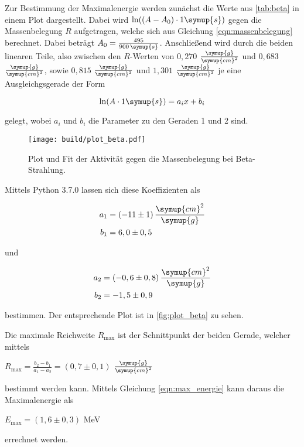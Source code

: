 Zur Bestimmung der Maximalenergie werden zunächst die Werte aus \autoref{tab:beta} in einem Plot dargestellt.
Dabei wird $\ln((A - A_0) \cdot 1 \symup{s})$ gegen die Massenbelegung $R$ aufgetragen, welche sich aus Gleichung \eqref{eqn:massenbelegung} berechnet.
Dabei beträgt $A_0 = \frac{495}{900 \, \symup{s}}$.
Anschließend wird durch die beiden linearen Teile,
also zwischen den $R$-Werten von $0,270$ $\frac{\symup{g}}{\symup{cm}^2}$ und $0,683$ $\frac{\symup{g}}{\symup{cm}^2}$, 
sowie $0,815$ $\frac{\symup{g}}{\symup{cm}^2}$ und $1,301$ $\frac{\symup{g}}{\symup{cm}^2}$ je eine Ausgleichgsgerade der Form

\begin{equation}
    \ln(A \cdot 1 \symup{s}) = a_i x + b_i
\end{equation}

gelegt, wobei $a_i$ und $b_i$ die Parameter zu den Geraden 1 und 2 sind.



\begin{figure}
    \centering
    \texttt{[image: build/plot\_beta.pdf]}
    \caption{Plot und Fit der Aktivität gegen die Massenbelegung bei Beta-Strahlung.}
    \label{fig:plot_beta}
\end{figure}

Mittels Python 3.7.0 lassen sich diese Koeffizienten als

\begin{align*}
    a_1 &= (-11 \pm 1) \, \frac{\symup{cm}^2}{\symup{g}}\\
    b_1 &= 6,0 \pm 0,5
\end{align*}

und

\begin{align*}
    a_2 &= (-0,6 \pm 0,8) \, \frac{\symup{cm}^2}{\symup{g}}\\
    b_2 &= -1,5 \pm 0,9
\end{align*}

bestimmen. Der entsprechende Plot ist in \autoref{fig:plot_beta} zu sehen.

Die maximale Reichweite $R_\text{max}$ ist der Schnittpunkt der beiden Gerade, welcher mittels

\begin{center}
    $R_\text{max} = \frac{b_2 - b_1}{a_1 - a_2} = (0,7 \pm 0,1)$ $\frac{\symup{g}}{\symup{cm}^2}$
\end{center}

bestimmt werden kann. Mittels Gleichung \eqref{eqn:max_energie} kann daraus die Maximalenergie als

\begin{center}
    $E_\text{max} = (1,6 \pm 0,3)$ MeV
\end{center}

errechnet werden.